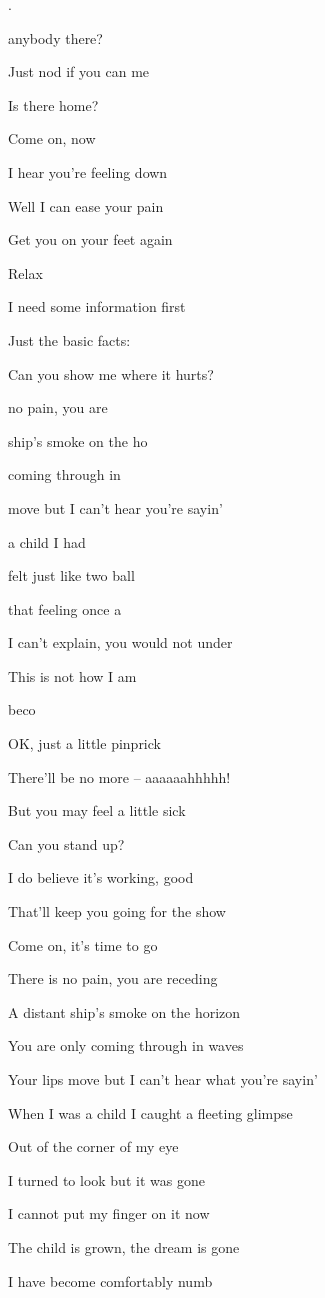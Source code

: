 
\zs
{}.

 anybody  there? 

Just nod if you can  me

Is there  home?
\ks

\zs
Come on, now

I hear you’re feeling down

Well I can ease your pain

Get you on your feet again
\ks

\zs
Relax

I need some information first

Just the basic facts:

Can you show me where it hurts? 
\ks

\zr
{} no pain, you are 

 ship’s smoke on the ho

 coming through in 

 move but I can’t hear  you’re sayin’

 a child I had 

 felt just like two ball

 that feeling once a

I can’t explain, you would not under

This is not how I am

  beco 
\kr

\zs
OK,
just a little pinprick

There’ll be no more -- aaaaaahhhhh!

But you may feel a little sick
\ks

\zs
Can you stand up? 

I do believe it’s working, good

That’ll keep you going for the show

Come on, it’s time to go
\ks

\zr
There is no pain, you are receding

A distant ship’s smoke on the horizon

You are only coming through in waves

Your lips move but I can’t hear what you’re sayin’

When I was a child I caught a fleeting glimpse

Out of the corner of my eye

I turned to look but it was gone

I cannot put my finger on it now

The child is grown, the dream is gone

I have become comfortably numb
\kr
\kp

